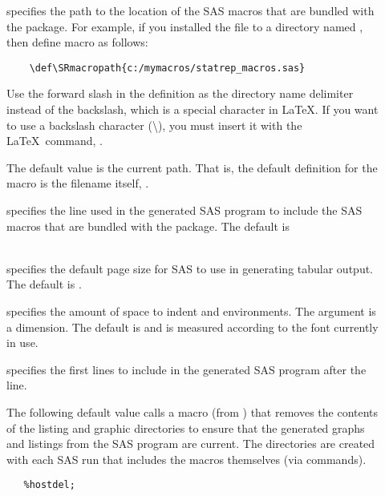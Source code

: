 \documentclass[article,oneside]{memoir}
\begin{document}
\begin{description}
     \item[] specifies the path to the location of the
     SAS macros that are bundled with the  package.
     For example, if  you installed the  file to a directory named
    ,
    then define macro  as follows:
    \begin{verbatim}
    \def\SRmacropath{c:/mymacros/statrep_macros.sas}
    \end{verbatim}

   Use the forward slash in the definition
   as the directory name delimiter instead of the backslash, which is a special
   character in \LaTeX. If you want to use a backslash character (\textbackslash), you
   must insert it with the \LaTeX\ command, .

   The default value is the current path. That is, the default
   definition for the  macro is the filename itself, .

     \item[] specifies the line used in the generated SAS program to
     include the SAS macros that are bundled with the  package.
     The default is\\~

    \item[] specifies the default page size for SAS to use in generating
    tabular output. The default is .


     \item[] specifies the amount of space to indent
      and  environments.
     The argument is a dimension.
     The default is \Code{3em} and is measured according to the font currently in use.

     \item[] specifies the first lines to include in the generated SAS program
     after the  line.

     The following default value calls a macro (from )
     that removes the contents of the listing and graphic directories to ensure
     that the generated graphs and listings from the SAS program are current.
     The directories are created with
     each SAS run that includes the macros themselves (via  commands).
\begin{snugshade}
\begin{verbatim}
   %hostdel;
\end{verbatim}
\end{snugshade}


\end{description}
\end{document}
